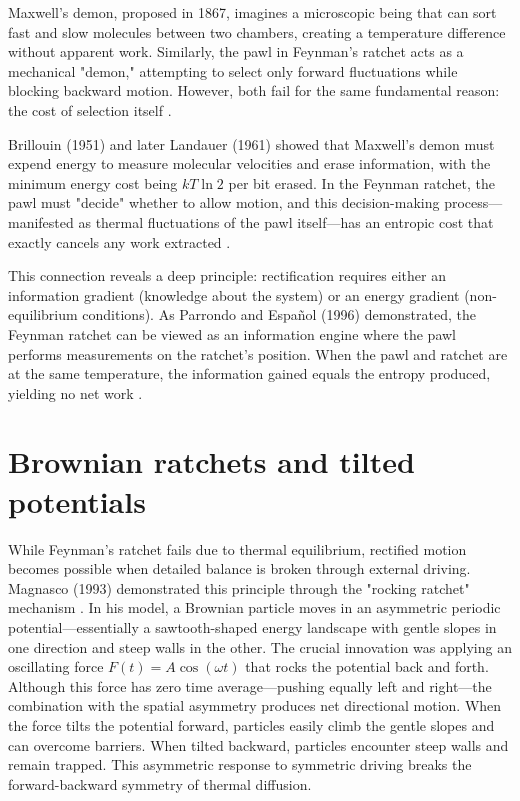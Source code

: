 Maxwell's demon, proposed in 1867, imagines a microscopic being that can sort fast and slow molecules between two chambers, creating a temperature difference without apparent work. Similarly, the pawl in Feynman's ratchet acts as a mechanical "demon," attempting to select only forward fluctuations while blocking backward motion. However, both fail for the same fundamental reason: the cost of selection itself \cite{maxwell1871theory, maxwell1867letter}.

Brillouin (1951) and later Landauer (1961) showed that Maxwell's demon must expend energy to measure molecular velocities and erase information, with the minimum energy cost being $kT\ln{2}$ per bit erased. In the Feynman ratchet, the pawl must "decide" whether to allow motion, and this decision-making process—manifested as thermal fluctuations of the pawl itself—has an entropic cost that exactly cancels any work extracted \cite{brillouin1951maxwell, landauer1961irreversibility}.

This connection reveals a deep principle: rectification requires either an information gradient (knowledge about the system) or an energy gradient (non-equilibrium conditions). As Parrondo and Español (1996) demonstrated, the Feynman ratchet can be viewed as an information engine where the pawl performs measurements on the ratchet's position. When the pawl and ratchet are at the same temperature, the information gained equals the entropy produced, yielding no net work \cite{parrondo1996criticism}.


\section{Brownian ratchets and tilted potentials}

While Feynman's ratchet fails due to thermal equilibrium, rectified motion becomes possible when detailed balance is broken through external driving. Magnasco (1993) demonstrated this principle through the "rocking ratchet" mechanism \cite{magnasco1993forced}. In his model, a Brownian particle moves in an asymmetric periodic potential—essentially a sawtooth-shaped energy landscape with gentle slopes in one direction and steep walls in the other.
The crucial innovation was applying an oscillating force $F(t) = A\cos(\omega t)$ that rocks the potential back and forth. Although this force has zero time average—pushing equally left and right—the combination with the spatial asymmetry produces net directional motion. When the force tilts the potential forward, particles easily climb the gentle slopes and can overcome barriers. When tilted backward, particles encounter steep walls and remain trapped. This asymmetric response to symmetric driving breaks the forward-backward symmetry of thermal diffusion.

